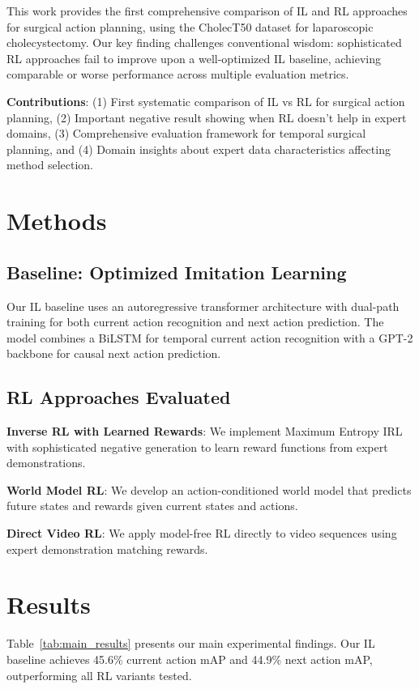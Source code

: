 \documentclass[runningheads]{llncs}
\begin{document}
This work provides the first comprehensive comparison of IL and RL approaches for surgical action planning, using the CholecT50 dataset for laparoscopic cholecystectomy. Our key finding challenges conventional wisdom: sophisticated RL approaches fail to improve upon a well-optimized IL baseline, achieving comparable or worse performance across multiple evaluation metrics.

\textbf{Contributions}: (1) First systematic comparison of IL vs RL for surgical action planning, (2) Important negative result showing when RL doesn't help in expert domains, (3) Comprehensive evaluation framework for temporal surgical planning, and (4) Domain insights about expert data characteristics affecting method selection.

\section{Methods}

\subsection{Baseline: Optimized Imitation Learning}

Our IL baseline uses an autoregressive transformer architecture with dual-path training for both current action recognition and next action prediction. The model combines a BiLSTM for temporal current action recognition with a GPT-2 backbone for causal next action prediction.

\subsection{RL Approaches Evaluated}

\textbf{Inverse RL with Learned Rewards}: We implement Maximum Entropy IRL with sophisticated negative generation to learn reward functions from expert demonstrations.

\textbf{World Model RL}: We develop an action-conditioned world model that predicts future states and rewards given current states and actions.

\textbf{Direct Video RL}: We apply model-free RL directly to video sequences using expert demonstration matching rewards.

\section{Results}

Table~\ref{tab:main_results} presents our main experimental findings. Our IL baseline achieves 45.6\% current action mAP and 44.9\% next action mAP, outperforming all RL variants tested.
\end{document}
